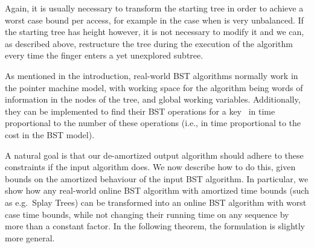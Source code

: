 \documentclass[11pt]{article}
\begin{document}
Again, it is usually necessary to transform the starting tree in order to
achieve a  worst case bound per access, for example in the case
when  is very unbalanced.  If the starting tree  has height  however, it is not necessary to modify it and we can, as described
above, restructure the tree during the execution of the algorithm every
time the finger enters a yet unexplored subtree.

As mentioned in the introduction, real-world BST algorithms normally work
in the pointer machine model, with working space for the algorithm being
 words of information in the nodes of the tree, and  global
working variables. Additionally, they can be implemented to find their BST
operations for a key~ in time proportional to the number of these
operations (i.e., in time proportional to the cost in the BST model).

A natural goal is that our de-amortized output algorithm should adhere to
these constraints if the input algorithm does. We now describe how to do
this, given bounds on the amortized behaviour of the input BST
algorithm. In particular, we show how any real-world online BST algorithm
with  amortized time bounds (such as e.g.\ Splay Trees) can be
transformed into an online BST algorithm with  worst case time
bounds, while not changing their running time on any sequence by more than
a constant factor. In the following theorem, the formulation is slightly
more general.
\end{document}
